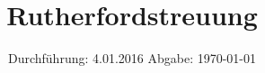 

\subject{V16}
\title{Rutherfordstreuung}
\date{
  Durchführung: 4.01.2016
  \hspace{3em}
  Abgabe: \today
}



\maketitle
\thispagestyle{empty}
\tableofcontents
\newpage



% 


\printbibliography


